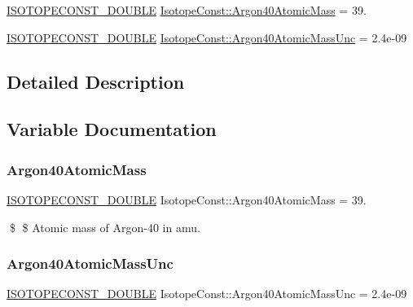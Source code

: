 \begin{DoxyCompactItemize}
\item 
\mbox{\hyperlink{group___isotope_const-_macros_ga8f45a7272ce02c0b4c65c44636ed719a}{I\+S\+O\+T\+O\+P\+E\+C\+O\+N\+S\+T\+\_\+\+D\+O\+U\+B\+LE}} \mbox{\hyperlink{group___isotope_const-_argon-_ar40_ga59a3e5ed3f734f2cd55e1b4ee33ce06e}{Isotope\+Const\+::\+Argon40\+Atomic\+Mass}} = 39.
\item 
\mbox{\hyperlink{group___isotope_const-_macros_ga8f45a7272ce02c0b4c65c44636ed719a}{I\+S\+O\+T\+O\+P\+E\+C\+O\+N\+S\+T\+\_\+\+D\+O\+U\+B\+LE}} \mbox{\hyperlink{group___isotope_const-_argon-_ar40_gace94749b2b57a265335fcca784db00b5}{Isotope\+Const\+::\+Argon40\+Atomic\+Mass\+Unc}} = 2.\+4e-\/09
\end{DoxyCompactItemize}


\subsection{Detailed Description}


\subsection{Variable Documentation}
\mbox{\label{group___isotope_const-_argon-_ar40_ga59a3e5ed3f734f2cd55e1b4ee33ce06e}} 
\subsubsection{\texorpdfstring{Argon40\+Atomic\+Mass}{Argon40AtomicMass}}
{\footnotesize\ttfamily \mbox{\hyperlink{group___isotope_const-_macros_ga8f45a7272ce02c0b4c65c44636ed719a}{I\+S\+O\+T\+O\+P\+E\+C\+O\+N\+S\+T\+\_\+\+D\+O\+U\+B\+LE}} Isotope\+Const\+::\+Argon40\+Atomic\+Mass = 39.}

\$ \$ Atomic mass of Argon-\/40 in amu. \mbox{\label{group___isotope_const-_argon-_ar40_gace94749b2b57a265335fcca784db00b5}} 
\subsubsection{\texorpdfstring{Argon40\+Atomic\+Mass\+Unc}{Argon40AtomicMassUnc}}
{\footnotesize\ttfamily \mbox{\hyperlink{group___isotope_const-_macros_ga8f45a7272ce02c0b4c65c44636ed719a}{I\+S\+O\+T\+O\+P\+E\+C\+O\+N\+S\+T\+\_\+\+D\+O\+U\+B\+LE}} Isotope\+Const\+::\+Argon40\+Atomic\+Mass\+Unc = 2.\+4e-\/09}

